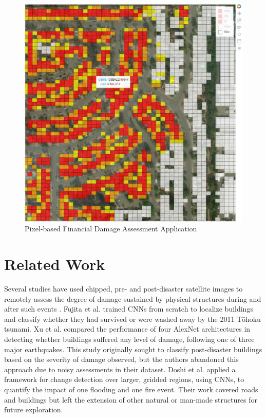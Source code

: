 \documentclass[conference]{IEEEtran}
\begin{document}
 \begin{figure}[htbp]
\centering\includegraphics[width=1\linewidth]{AppImage.png}
\caption{Pixel-based Financial Damage Assessment Application}
\label{appbig}
\end{figure}


\section{Related Work}

Several studies have used chipped, pre- and post-disaster satellite images to remotely assess the degree of damage sustained by physical structures during and after such events \cite{a3, a4, a5}. Fujita et al. \cite{a3} trained CNNs from scratch to localize buildings and classify whether they had survived or were washed away by the 2011 Tōhoku tsunami. Xu et al. \cite{a4} compared the performance of four AlexNet architectures\cite{a6} in detecting whether buildings suffered any level of damage, following one of three major earthquakes. This study originally sought to classify post-disaster buildings based on the severity of damage observed, but the authors abandoned this approach due to noisy assessments in their dataset. Doshi et al. \cite{a5} applied a framework for change detection over larger, gridded regions, using CNNs, to quantify the impact of one flooding and one fire event. Their work covered roads and buildings but left the extension of other natural or man-made structures for future exploration.
\end{document}
